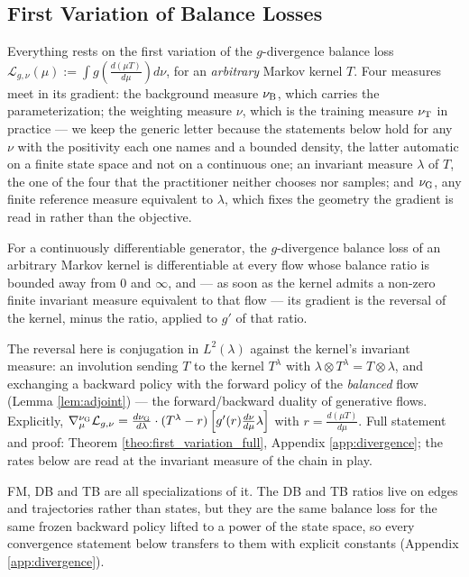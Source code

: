 \subsection{First Variation of Balance Losses}

Everything rests on the first variation of the $g$-divergence balance loss
$\mathcal L_{g,\nu}(\mu) := \int g\left(\frac{d(\mu T)}{d\mu}\right)d\nu$, for an
\emph{arbitrary} Markov kernel $T$. Four measures meet in its gradient: the background
measure $\nu_{\mathrm{B}}$, which carries the parameterization; the weighting measure $\nu$, which is
the training measure $\nu_{\mathrm{T}}$ in practice --- we keep the generic letter because the
statements below hold for any $\nu$ with the positivity each one names and a bounded density,
the latter automatic on a finite state space and not on a continuous one; an invariant measure
$\lambda$ of $T$, the one of the four that the practitioner neither chooses nor samples; and
$\nu_{\mathrm{G}}$, any finite reference measure equivalent to $\lambda$, which fixes the geometry the
gradient is read in rather than the objective.

\begin{theorem}\label{theo:first_variation}
For a continuously differentiable generator, the $g$-divergence balance loss of an arbitrary
Markov kernel is differentiable at every flow whose balance ratio is bounded away from $0$ and
$\infty$, and --- as soon as the kernel admits a non-zero finite invariant measure equivalent
to that flow --- its gradient is the reversal of the kernel, minus the ratio, applied to $g'$
of that ratio.
\end{theorem}
The reversal here is conjugation in $L^2(\lambda)$ against the kernel's invariant measure: an
involution sending $T$ to the kernel $T^\lambda$ with $\lambda\otimes T^\lambda = T\otimes\lambda$,
and exchanging a backward policy with the forward policy of the \emph{balanced} flow (Lemma
\ref{lem:adjoint}) --- the forward/backward duality of generative flows. Explicitly,
$\nabla_{\mu}^{\nu_{\mathrm{G}}}\mathcal L_{g,\nu} = \frac{d\nu_{\mathrm{G}}}{d\lambda}\cdot(T^\lambda-r)\left[g'(r)\frac{d\nu}{d\mu}\lambda\right]$
with $r=\frac{d(\mu T)}{d\mu}$. Full statement and proof: Theorem
\ref{theo:first_variation_full}, Appendix \ref{app:divergence}; the rates below are read at
the invariant measure of the chain in play.

FM, DB and TB are all specializations of it. The DB and TB ratios live on edges and trajectories rather than
states, but they are the same balance loss for the same frozen backward policy lifted to a
power of the state space, so every convergence statement below transfers to them with explicit
constants (Appendix \ref{app:divergence}).

